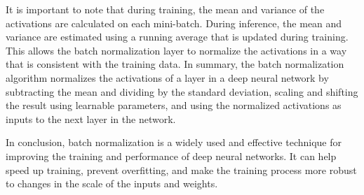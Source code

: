 It is important to note that during training, the mean and variance of the activations are calculated on each mini-batch. During inference, the mean and variance are estimated using a running average that is updated during training. This allows the batch normalization layer to normalize the activations in a way that is consistent with the training data. In summary, the batch normalization algorithm normalizes the activations of a layer in a deep neural network by subtracting the mean and dividing by the standard deviation, scaling and shifting the result using learnable parameters, and using the normalized activations as inputs to the next layer in the network.

\hspace{1cm}

In conclusion, batch normalization is a widely used and effective technique for improving the training and performance of deep neural networks. It can help speed up training, prevent overfitting, and make the training process more robust to changes in the scale of the inputs and weights.